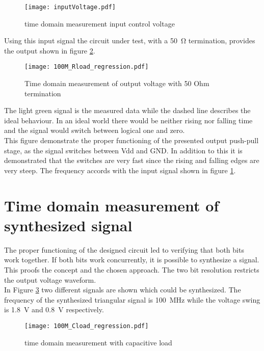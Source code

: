 \begin{figure}[htb!]
	\centering
  \texttt{[image: inputVoltage.pdf]}
	\caption{time domain measurement input control voltage}
	\label{fig:inputMeas}
\end{figure}


Using this input signal the circuit under test, with a \SI{50}{\ohm} termination, provides the output shown in figure \ref{fig:measRload100M}.


\begin{figure}[htb!]
	\centering
  \texttt{[image: 100M\_Rload\_regression.pdf]}
	\caption{Time domain measurement of output voltage with 50 Ohm termination}
	\label{fig:measRload100M}
\end{figure}

The light green signal is the measured data while the dashed line describes the ideal behaviour.
In an ideal world there would be neither rising nor falling time and the signal would switch between logical one and zero.\\
This figure demonstrate the proper functioning of the presented output push-pull stage, as the signal switches between Vdd and GND.
In addition to this it is demonstrated that the switches are very fast since the rising and falling edges are very steep.
The frequency accords with the input signal shown in figure \ref{fig:inputMeas}.


\section{Time domain measurement of synthesized signal}
The proper functioning of the designed circuit led to verifying that both bits work together.
If both bits work concurrently, it is possible to synthesize a signal.
This proofs the concept and the chosen approach.
The two bit resolution restricts the output voltage waveform.\\
In Figure \ref{fig:measCload100M} two different signals are shown which could be synthesized. 
The frequency of the synthesized triangular signal is \SI{100}{\mega \hertz} while the voltage swing is \SI{1.8}{\volt} and \SI{0.8}{\volt} respectively.

\begin{figure}[htb!]
	\centering
  \texttt{[image: 100M\_Cload\_regression.pdf]}
	\caption{time domain measurement with capacitive load}
	\label{fig:measCload100M}
\end{figure}

